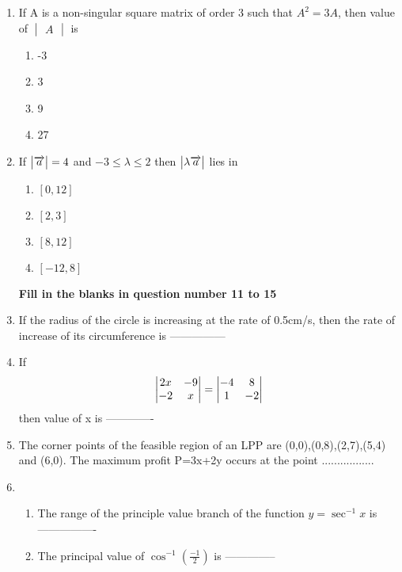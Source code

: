 \documentclass[journal,12pt,twocolumn]{IEEEtran}
\renewcommand\thesection{\arabic{section}}
\begin{document}
\begin{enumerate}[label=\thesection.\arabic*.,ref=\thesection.\theenumi]
\item  If A is a non-singular square matrix of order 3 such that $ A^2 =3A $, then value of  $\begin{vmatrix}A \end{vmatrix}$ is

\begin{enumerate}
    \item -3
     \item 3
     \item 9
     \item 27
\end{enumerate}
\item  If $\begin{vmatrix}\overrightarrow{a}\end{vmatrix} = 4 $ and  $ -3\leq \lambda \leq 2 $ then $\begin{vmatrix}\lambda \overrightarrow{a}\end{vmatrix} $ lies in

\begin{enumerate}
    \item $\left[0,12\right]$
    \item $\left[2,3\right]$
    \item $\left[8,12\right]$
    \item $\left[-12,8\right]$
\end{enumerate}
\pagebreak
\textbf{Fill in the blanks in question number 11 to 15}\\

\item  If the radius of the circle is increasing at the rate of 0.5cm/s, then the rate of increase of its circumference is ---------------\\
\item  If \begin{align} \begin{vmatrix}2x & -9 \\ -2 & x\end{vmatrix}  = \begin{vmatrix}-4 & 8 \\ 1 & -2 \end{vmatrix} \nonumber \end{align} then value of x is -------------\\
\item  The corner points of the feasible region of an LPP are (0,0),(0,8),(2,7),(5,4) and (6,0). The maximum profit P=3x+2y occurs at the point .................\\
\item \begin{enumerate} \item The range of the principle value branch of the function $ y= \sec^{-1}x $ is ----------------
    
\item The principal value of $\cos^{-1} \left(\frac{-1}{2}\right)$ is --------------\\
\end{enumerate}


\end{enumerate}
\end{document}
